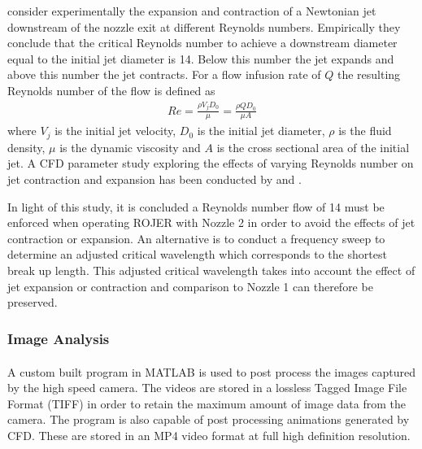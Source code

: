 \documentclass[11pt]{article}
\begin{document}
\cite{goren1966shape} consider experimentally the expansion and contraction of a Newtonian jet downstream of the nozzle exit at different Reynolds numbers. Empirically they conclude that the critical Reynolds number to achieve a downstream diameter equal to the initial jet diameter is 14. Below this number the jet expands and above this number the jet contracts. For a flow infusion rate of $Q$ the resulting Reynolds number of the flow is defined as
\begin{align*}
Re = \frac{\rho V_j D_0 }{\mu} = \frac{\rho Q D_0 }{\mu A }
\end{align*}
where $V_j$ is the initial jet velocity, $D_0$ is the initial jet diameter, $\rho$ is the fluid density, $\mu$ is the dynamic viscosity and $A$ is the cross sectional area of the initial jet. A CFD parameter study exploring the effects of varying Reynolds number on jet contraction and expansion has been conducted by \cite{greiciunas2015report} and \cite{gorbatenko2015report}.

In light of this study, it is concluded a Reynolds number flow of 14 must be enforced when operating ROJER with Nozzle 2 in order to avoid the effects of jet contraction or expansion. An alternative is to conduct a frequency sweep to determine an adjusted critical wavelength which corresponds to the shortest break up length. This adjusted critical wavelength takes into account the effect of jet expansion or contraction and comparison to Nozzle 1 can therefore be preserved.

\subsubsection{Image Analysis} \label{sec:image_analysis}
A custom built program in MATLAB \textsuperscript{\textregistered} is used to post process the images captured by the high speed camera. The videos are stored in a lossless Tagged Image File Format (TIFF) in order to retain the maximum amount of image data from the camera. The program is also capable of post processing animations generated by CFD. These are stored in an MP4 video format at full high definition resolution.
\end{document}
